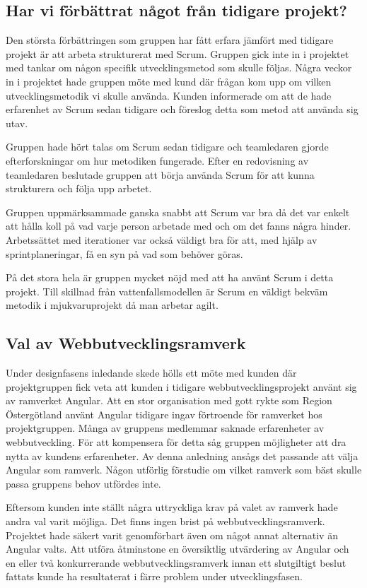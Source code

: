 \subsection{Har vi förbättrat något från tidigare projekt?}

Den största förbättringen som gruppen har fått erfara jämfört med tidigare projekt är att arbeta strukturerat med Scrum. 
Gruppen gick inte in i projektet med tankar om någon specifik utvecklingsmetod som skulle följas. Några veckor in i projektet hade gruppen möte med kund där frågan kom upp om vilken utvecklingsmetodik vi skulle använda. 
Kunden informerade om att de hade erfarenhet av Scrum sedan tidigare och föreslog detta som metod att använda sig utav.

Gruppen hade hört talas om Scrum sedan tidigare och teamledaren gjorde efterforskningar om hur metodiken fungerade. 
Efter en redovisning av teamledaren beslutade gruppen att börja använda Scrum för att kunna strukturera och följa upp arbetet. 

Gruppen uppmärksammade ganska snabbt att Scrum var bra då det var enkelt att hålla koll på vad varje person arbetade med och om det fanns några hinder. Arbetssättet med iterationer var också väldigt bra för att, med hjälp av sprintplaneringar, få en syn på vad som behöver göras. 

På det stora hela är gruppen mycket nöjd med att ha använt Scrum i detta projekt. Till skillnad från vattenfallsmodellen\cite{vattenfall} är Scrum en väldigt bekväm metodik i mjukvaruprojekt då man arbetar agilt.

\subsection{Val av Webbutvecklingsramverk}

Under designfasens inledande skede hölls ett möte med kunden där projektgruppen fick veta att kunden i tidigare webbutvecklingsprojekt använt sig av ramverket Angular. Att en stor organisation med gott rykte som Region Östergötland använt Angular tidigare ingav förtroende för ramverket hos projektgruppen. Många av gruppens medlemmar saknade erfarenheter av webbutveckling. För att kompensera för detta såg gruppen möjligheter att dra nytta av kundens erfarenheter. Av denna anledning ansågs det passande att välja Angular som ramverk. Någon utförlig förstudie om vilket ramverk som bäst skulle passa gruppens behov utfördes inte.

Eftersom kunden inte ställt några uttryckliga krav på valet av ramverk hade andra val varit möjliga. Det finns ingen brist på webbutvecklingsramverk. Projektet hade säkert varit genomförbart även om något annat alternativ än Angular valts. Att utföra åtminstone en översiktlig utvärdering av Angular och en eller två konkurrerande webbutvecklingsramverk innan ett slutgiltigt beslut fattats kunde ha resultaterat i färre problem under utvecklingsfasen.

